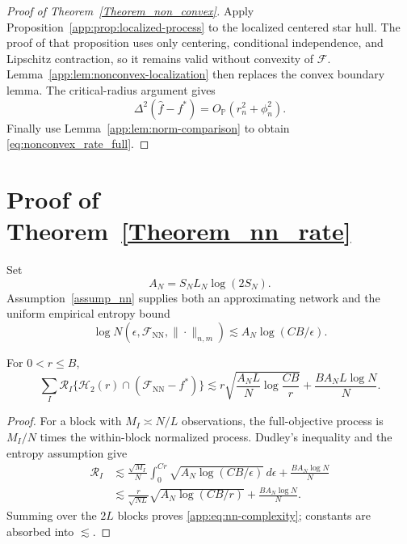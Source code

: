 \documentclass[twoside,11pt]{article}
\newenvironment{revision}{\color{revisionred}}{}
\begin{document}
\begin{revision}
\begin{proof}[Proof of Theorem~\ref{Theorem_non_convex}]
Apply Proposition~\ref{app:prop:localized-process} to the localized centered
star hull.  The proof of that proposition uses only centering, conditional
independence, and Lipschitz contraction, so it remains valid without convexity
of $\mathcal F$.  Lemma~\ref{app:lem:nonconvex-localization} then replaces the
convex boundary lemma.  The critical-radius argument gives
\[
 \Delta^2(\widehat f-f^*)=O_{\mathbb P}(r_n^2+\phi_n^2).
\]
Finally use Lemma~\ref{app:lem:norm-comparison} to obtain
\eqref{eq:nonconvex_rate_full}.
\end{proof}


\section{Proof of Theorem~\ref{Theorem_nn_rate}}
\label{app:nn}

Set
\begin{equation}
 A_N=S_NL_N\log(2S_N).                                         \label{app:eq:AN-network}
\end{equation}
Assumption~\ref{assump_nn} supplies both an approximating network and the
uniform empirical entropy bound
\[
 \log N(\epsilon,\mathcal F_{\mathrm{NN}},\|\cdot\|_{n,m})
 \lesssim A_N\log(CB/\epsilon).
\]

\begin{lemma}
\label{app:lem:nn-complexity}
For $0<r\le B$,
\begin{equation}
 \sum_I\mathcal R_I\{\mathcal H_2(r)\cap
 (\mathcal F_{\mathrm{NN}}-f^*)\}
 \lesssim
 r\sqrt{\frac{A_NL}{N}\log\frac{CB}{r}}
 +\frac{BA_NL\log N}{N}.                                      \label{app:eq:nn-complexity}
\end{equation}
\end{lemma}

\begin{proof}
For a block with $M_I\asymp N/L$ observations, the full-objective process is
$M_I/N$ times the within-block normalized process.  Dudley's inequality and
the entropy assumption give
\begin{align*}
 \mathcal R_I
 &\lesssim \frac{\sqrt{M_I}}{N}
 \int_0^{Cr}\sqrt{A_N\log(CB/\epsilon)}\,d\epsilon
 +\frac{BA_N\log N}{N}\\
 &\lesssim \frac{r}{\sqrt{NL}}
 \sqrt{A_N\log(CB/r)}+\frac{BA_N\log N}{N}.
\end{align*}
Summing over the $2L$ blocks proves \eqref{app:eq:nn-complexity}; constants are
absorbed into $\lesssim$.
\end{proof}


\end{revision}
\end{document}
